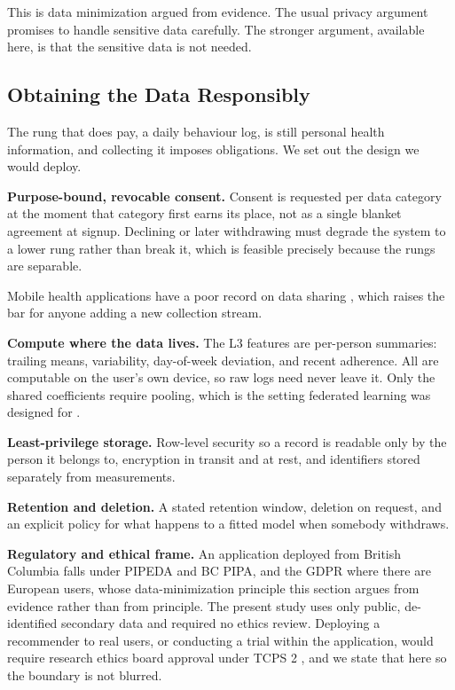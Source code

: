 \documentclass[conference]{IEEEtran}
\begin{document}
This is data minimization argued from evidence. The usual privacy argument promises to handle sensitive data carefully. The stronger argument, available here, is that the sensitive data is not needed.

\subsection{Obtaining the Data Responsibly}
The rung that does pay, a daily behaviour log, is still personal health information, and collecting it imposes obligations. We set out the design we would deploy.

\textbf{Purpose-bound, revocable consent.} Consent is requested per data category at the moment that category first earns its place, not as a single blanket agreement at signup. Declining or later withdrawing must degrade the system to a lower rung rather than break it, which is feasible precisely because the rungs are separable.

Mobile health applications have a poor record on data sharing \cite{tangari2021bmj, papageorgiou2018privacy}, which raises the bar for anyone adding a new collection stream.

\textbf{Compute where the data lives.} The L3 features are per-person summaries: trailing means, variability, day-of-week deviation, and recent adherence. All are computable on the user's own device, so raw logs need never leave it. Only the shared coefficients require pooling, which is the setting federated learning was designed for \cite{rieke2020federated}.

\textbf{Least-privilege storage.} Row-level security so a record is readable only by the person it belongs to, encryption in transit and at rest, and identifiers stored separately from measurements.

\textbf{Retention and deletion.} A stated retention window, deletion on request, and an explicit policy for what happens to a fitted model when somebody withdraws.

\textbf{Regulatory and ethical frame.} An application deployed from British Columbia falls under PIPEDA \cite{pipeda2000} and BC PIPA, and the GDPR \cite{gdpr2016} where there are European users, whose data-minimization principle this section argues from evidence rather than from principle. The present study uses only public, de-identified secondary data and required no ethics review. Deploying a recommender to real users, or conducting a trial within the application, would require research ethics board approval under TCPS 2 \cite{tcps2022}, and we state that here so the boundary is not blurred.
\end{document}
